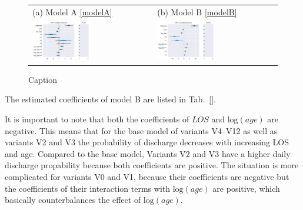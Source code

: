 \documentclass{elsarticle}
\begin{document}
\begin{figure}
    \centering
    \begin{tabular}{ll}
(a) Model A \eqref{modelA} & (b) Model B \eqref{modelB}\\
\includegraphics[width=0.5\textwidth]{images/DS19fm0_c0__forestplot_model_A.pdf}&
\includegraphics[width=0.5\textwidth]{images/DS19fk1_c0__forestplot_model_B}\\
\end{tabular}
    \caption{Caption}
    \label{fig:forest_plots}
\end{figure}

The estimated coefficients of model B are listed in Tab.~\ref{}.



It is important to note that both the coefficients of $LOS$ and $\text{log}(age)$ are negative. This means that for the base model of variants V4--V12 as well as variants V2 and V3 the probability of discharge decreases with increasing LOS and age. 
Compared to the base model, Variants V2 and V3 have a higher daily discharge propability because both coefficients are positive. 
The situation is more complicated for variants V0 and V1, because their coefficients are negative but the coefficients of their interaction terms with $\text{log}(age)$ are positive, which basically counterbalances the effect of $\text{log}(age)$.
\end{document}
